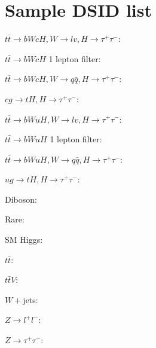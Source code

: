 \section{Sample DSID list}
\label{sec:DSIDlist}
$t\bar{t}\to bWcH, W\to lv, H\to\tau^+\tau^-$: 

$t\bar{t}\to bWcH$ 1 lepton filter: 

$t\bar{t}\to bWcH, W\to q\bar{q}, H\to\tau^+\tau^-$: 

$cg\to tH, H\to\tau^+\tau^-$: 

$t\bar{t}\to bWuH, W\to lv, H\to\tau^+\tau^-$: 

$t\bar{t}\to bWuH$ 1 lepton filter: 

$t\bar{t}\to bWuH, W\to q\bar{q}, H\to\tau^+\tau^-$: 

$ug\to tH, H\to\tau^+\tau^-$: 

Diboson: 

Rare: 

SM Higgs: 

$t\bar{t}$: 

$t\bar{t}V$: 

$W+$jets: 

$Z\to l^+l^-$: 

$Z\to\tau^+\tau^-$: 